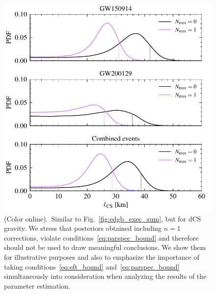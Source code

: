 \documentclass[twocolumn,
               prd,
               aps,
               superscriptaddress,
               tightenlines,
               nofootinbib,
               eqsecnum,
               amsfonts,
               amsmath,
               longbibliography]{revtex4-1}
\begin{document}
\begin{figure}[t]
\includegraphics[width=\columnwidth]{figs/dcs_posteriors_combined.pdf}
\caption{(Color online).~Similar to Fig.~\ref{fig:edgb_exec_sum}, but for dCS gravity.
%
%
We stress that posteriors obtained including $n=1$ corrections, violate conditions~\eqref{eq:parspec_bound}
and therefore should not be used to draw meaningful conclusions. We show them for illustrative purposes
and also to emphasize the importance of taking conditions~\eqref{eq:eft_bound} and~\eqref{eq:parspec_bound}
simultaneously into consideration when analyzing the results of the parameter estimation.
}
\label{fig:dCS_exec_sum}
\end{figure}
\end{document}
